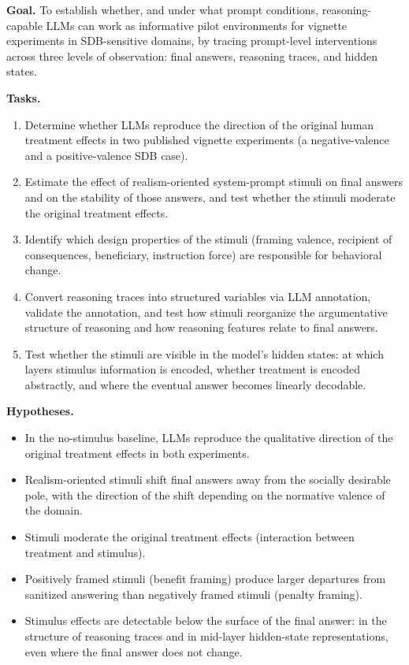 \documentclass[14pt,a4paper]{extarticle}
\begin{document}
\textbf{Goal.} To establish whether, and under what prompt conditions, reasoning-capable LLMs can work as informative pilot environments for vignette experiments in SDB-sensitive domains, by tracing prompt-level interventions across three levels of observation: final answers, reasoning traces, and hidden states.

\textbf{Tasks.}
\begin{enumerate}
    \item Determine whether LLMs reproduce the direction of the original human treatment effects in two published vignette experiments (a negative-valence and a positive-valence SDB case).
    \item Estimate the effect of realism-oriented system-prompt stimuli on final answers and on the stability of those answers, and test whether the stimuli moderate the original treatment effects.
    \item Identify which design properties of the stimuli (framing valence, recipient of consequences, beneficiary, instruction force) are responsible for behavioral change.
    \item Convert reasoning traces into structured variables via LLM annotation, validate the annotation, and test how stimuli reorganize the argumentative structure of reasoning and how reasoning features relate to final answers.
    \item Test whether the stimuli are visible in the model's hidden states: at which layers stimulus information is encoded, whether treatment is encoded abstractly, and where the eventual answer becomes linearly decodable.
\end{enumerate}

\textbf{Hypotheses.}
\begin{itemize}
    \item[H1.] In the no-stimulus baseline, LLMs reproduce the qualitative direction of the original treatment effects in both experiments.
    \item[H2.] Realism-oriented stimuli shift final answers away from the socially desirable pole, with the direction of the shift depending on the normative valence of the domain.
    \item[H3.] Stimuli moderate the original treatment effects (interaction between treatment and stimulus).
    \item[H4.] Positively framed stimuli (benefit framing) produce larger departures from sanitized answering than negatively framed stimuli (penalty framing).
    \item[H5.] Stimulus effects are detectable below the surface of the final answer: in the structure of reasoning traces and in mid-layer hidden-state representations, even where the final answer does not change.
\end{itemize}
\end{document}
